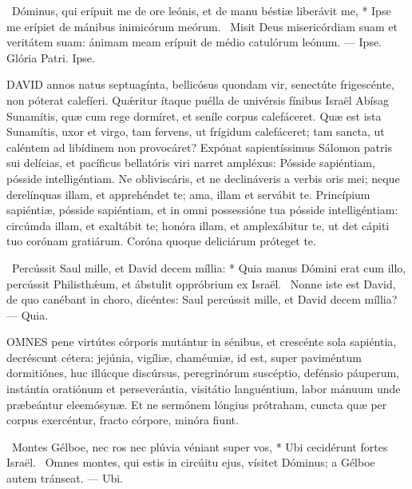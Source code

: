 \R\ Dóminus, qui erípuit me de ore leónis, et de manu béstiæ liberávit me, * Ipse me erípiet de mánibus inimicórum meórum. \V\ Misit Deus misericórdiam suam et veritátem suam: ánimam meam erípuit de médio catulórum leónum. --- Ipse. Glória Patri. Ipse.




\lettrine[lines=2]{D}{AVID} annos natus septuagínta, bellicósus quondam vir, senectúte frigescénte, non póterat calefíeri. Quǽritur ítaque puélla de univérsis fínibus Israël Abísag Sunamítis, quæ cum rege dormíret, et seníle corpus calefáceret. Quæ est ista Sunamítis, uxor et virgo, tam fervens, ut frígidum calefáceret; tam sancta, ut caléntem ad libídinem non provocáret? Expónat sapientíssimus Sálomon patris sui delícias, et pacíficus bellatóris viri narret ampléxus: Pósside sapiéntiam, pósside intelligéntiam. Ne obliviscáris, et ne declináveris a verbis oris mei; neque derelínquas illam, et apprehéndet te; ama, illam et servábit te. Princípium sapiéntiæ, pósside sapiéntiam, et in omni possessióne tua pósside intelligéntiam: circúmda illam, et exaltábit te; honóra illam, et amplexábitur te, ut det cápiti tuo corónam gratiárum. Coróna quoque deliciárum próteget te.

\R\ Percússit Saul mille, et David decem míllia: * Quia manus Dómini erat cum illo, percússit Philisthǽum, et ábstulit oppróbrium ex Israël. \V\ Nonne iste est David, de quo canébant in choro, dicéntes: Saul percússit mille, et David decem míllia? --- Quia.


\lettrine[lines=2]{O}{MNES} pene virtútes córporis mutántur in sénibus, et crescénte sola sapiéntia, decréscunt cétera: jejúnia, vigíliæ, chaméuniæ, id est, super paviméntum dormitiónes, huc illúcque discúrsus, peregrinórum suscéptio, defénsio páuperum, instántia oratiónum et perseverántia, visitátio languéntium, labor mánuum unde præbeántur eleemósynæ. Et ne sermónem lóngius prótraham, cuncta quæ per corpus exercéntur, fracto córpore, minóra fiunt.

\R\ Montes Gélboe, nec ros nec plúvia véniant super vos, * Ubi cecidérunt fortes Israël. \V\ Omnes montes, qui estis in circúitu ejus, vísitet Dóminus; a Gélboe autem tránseat. --- Ubi.


